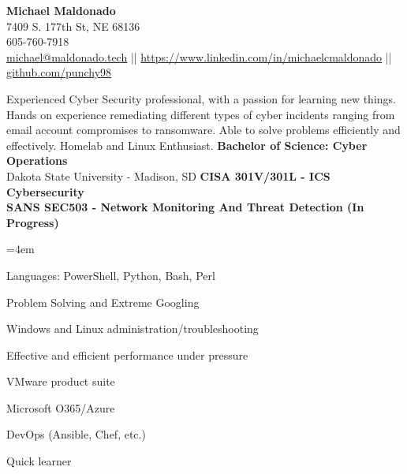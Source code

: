 \documentclass[a4paper,10pt]{article}
\begin{document}
\begin{center}
    \textbf{\LARGE Michael Maldonado} \\
    7409 S. 177th St, NE 68136 \\
    605-760-7918 \\
    \href{mailto:michael@maldonado.tech}{michael@maldonado.tech} ||
    \href{www.linkedin.com/in/michaelcmaldonado}{https://www.linkedin.com/in/michaelcmaldonado} ||
    \href{https://github.com/punchy98}{github.com/punchy98} 
\end{center}

Experienced Cyber Security professional, with a passion for learning new things. Hands on experience remediating different types of cyber incidents ranging from email account compromises to ransomware. Able to solve problems efficiently and effectively. Homelab and Linux Enthusiast.
\textbf{Bachelor of Science: Cyber Operations} \\
Dakota State University - Madison, SD 
\textbf{CISA 301V/301L - ICS Cybersecurity} \\
\textbf{SANS SEC503 - Network Monitoring And Threat Detection (In Progress)}
\begin{itemize}
    \begin{multicols}{2}
    \leftskip=4em
    \item Languages: PowerShell, Python, Bash, Perl
    \item Problem Solving and Extreme Googling
    \item Windows and Linux administration/troubleshooting
    \item Effective and efficient performance under pressure
    \item VMware product suite
    \item Microsoft O365/Azure
    \item DevOps (Ansible, Chef, etc.)
    \item Quick learner
    \end{multicols}
\end{itemize}

\end{document}

